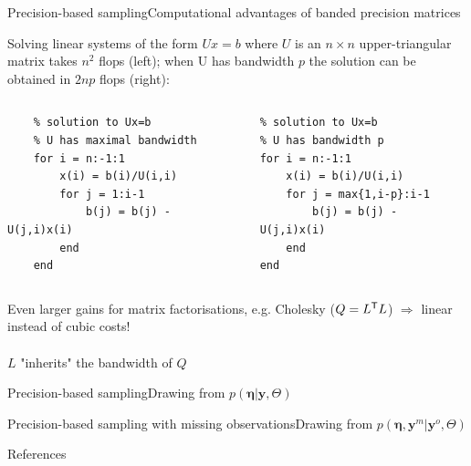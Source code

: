\documentclass[xcolor=svgnames, 10pt, aspectratio=169]{beamer}
\newcommand\transpose[1]{{#1}^{\sf{T}}}
\begin{document}
\begin{frame}[fragile]{Precision-based sampling}{Computational advantages of banded precision matrices}

    Solving linear systems of the form $Ux = b$ where $U$ is an $n \times n$ upper-triangular matrix takes $n^2$ flops (left); when U has bandwidth $p$ the solution can be obtained in $2 n p$ flops (right):

    \begin{columns}
        \begin{lstlisting}
    % solution to Ux=b
    % U has maximal bandwidth
    for i = n:-1:1
        x(i) = b(i)/U(i,i)
        for j = 1:i-1
            b(j) = b(j) - U(j,i)x(i)
        end
    end
        \end{lstlisting}
        \begin{lstlisting}
% solution to Ux=b
% U has bandwidth p            
for i = n:-1:1
    x(i) = b(i)/U(i,i)
    for j = max{1,i-p}:i-1
        b(j) = b(j) - U(j,i)x(i)
    end
end
        \end{lstlisting}
    \end{columns}
    \vspace{0.3cm}

    Even larger gains for matrix factorisations, e.g. Cholesky ($Q = \transpose{L}L$) $\Longrightarrow$ linear instead of cubic costs! \\~\\

    $L$ "inherits" the bandwidth of $Q$ \citep[][Theorem X]{golubvanloan2013}
\end{frame}

\begin{frame}[fragile]{Precision-based sampling}{Drawing from $p(\boldsymbol{\eta} | \mathbf{y}, \Theta)$}

\end{frame}

\begin{frame}{Precision-based sampling with missing observations}{Drawing from $p(\boldsymbol{\eta}, \mathbf{y}^m | \mathbf{y}^o, \Theta)$}
    
\end{frame}

\begin{frame}[t, allowframebreaks]{References}
    \scriptsize     
    
    
\end{frame}
\end{document}
